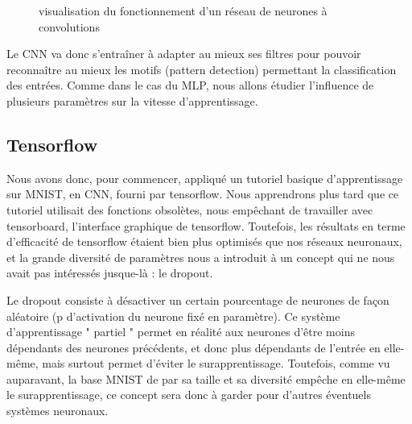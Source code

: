 \documentclass[
    10pt,
    a4paper,
    oneside,
    headinclude,footinclude,
    BCOR=5mm,
    captions=tableabove
]{scrartcl}
\begin{document}
\begin{figure}[H]
\centering
{}
\hspace{1mm}
\caption{visualisation du fonctionnement d'un réseau de neurones à convolutions}
\end{figure}


Le CNN va donc s'entraîner à adapter au mieux ses filtres pour pouvoir reconnaître au mieux les motifs (pattern detection) permettant la classification des entrées. Comme dans le cas du MLP, nous allons étudier l'influence de plusieurs paramètres sur la vitesse d'apprentissage. 

\subsection{Tensorflow}

Nous avons donc, pour commencer, appliqué un tutoriel basique d'apprentissage sur MNIST, en CNN, fourni par tensorflow. Nous apprendrons plus tard que ce tutoriel utilisait des fonctions obsolètes, nous empêchant de travailler avec tensorboard, l'interface graphique de tensorflow. Toutefois, les résultats en terme d'efficacité de tensorflow étaient bien plus optimisés que nos réseaux neuronaux, et la grande diversité de paramètres nous a introduit à un concept qui ne nous avait pas intéressés jusque-là : le dropout.

Le dropout consiste à désactiver un certain pourcentage de neurones de façon aléatoire (p d'activation du neurone fixé en paramètre). Ce système d'apprentissage " partiel " permet en réalité aux neurones d'être moins dépendants des neurones précédents, et donc plus dépendants de l'entrée en elle-même, mais surtout permet d'éviter le surapprentissage. Toutefois, comme vu auparavant, la base MNIST de par sa taille et sa diversité empêche en elle-même le surapprentissage, ce concept sera donc à garder pour d'autres éventuels systèmes neuronaux.
\end{document}
